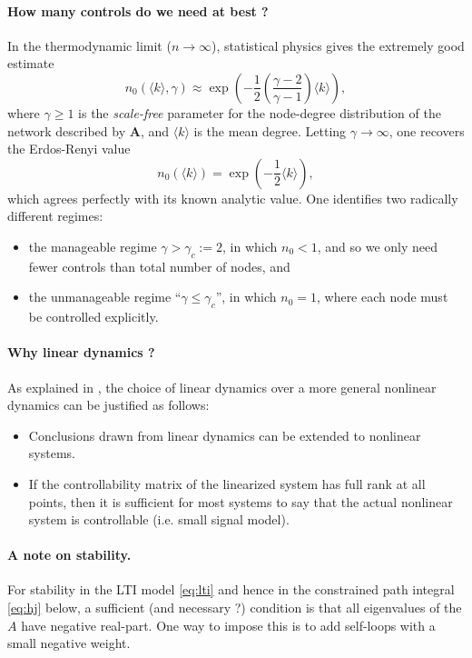 \documentclass{article} %
\def\A{\mathbf{A}}
\begin{document}
\paragraph{How many controls do we need at best ?}
In the thermodynamic limit ($n \rightarrow \infty$), statistical physics \citep{Liu2011} gives the extremely good estimate
\begin{equation}
  n_0(\langle k\rangle, \gamma) \approx \exp\left(-\frac{1}{2}\left(\frac{\gamma-2}{\gamma - 1}\right)\langle k \rangle\right),
\end{equation}
where $\gamma \ge 1$ is the \textit{scale-free} parameter for the node-degree distribution of the network described by $\A$, and $\langle k \rangle$ is the mean degree. Letting $\gamma \rightarrow \infty$, one recovers the Erdos-Renyi value
\begin{equation}
  n_0(\langle k\rangle) = \exp\left(-\frac{1}{2}\langle k\rangle\right),
\end{equation}
which agrees perfectly with its known analytic value. One identifies two radically different regimes:
\begin{itemize}
  \item the manageable regime $\gamma > \gamma_c := 2$, in which $n_0 < 1$, and so we only need fewer controls than total number of nodes, and
\item the unmanageable regime ``$\gamma \le \gamma_c$'', in which  $n_0 = 1$, where each node must be controlled explicitly.
\end{itemize}

\paragraph{Why linear dynamics ?}
As explained in \citep{Liu2011}, the choice of linear dynamics over a more general nonlinear dynamics can be justified as follows:
\begin{itemize}
  \item  Conclusions drawn from linear dynamics can be
extended to nonlinear systems.
\item If the controllability matrix of the linearized system
has full rank at all points, then it is sufficient for most
systems to say that the actual nonlinear system is
controllable (i.e. small signal model).
\end{itemize}

\paragraph{A note on stability.}
For stability in the LTI model \eqref{eq:lti} and hence in the constrained path integral \eqref{eq:hj} below, a sufficient (and necessary ?) condition is that all eigenvalues of the $A$ have negative real-part. One way to impose this is to add self-loops with a small negative weight.
\end{document}
